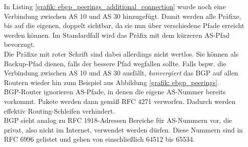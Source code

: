 In Listing \ref{grafik: ebgp_peerings_additional_connection} wurde noch eine Verbindung zwischen AS 10 und AS 30 hinzugefügt. Damit werden alle Präfixe, bis auf die eigenen, doppelt sichtbar, da sie nun über verschiedene Pfade erreicht werden können. Im Standardfall wird das Präfix mit dem kürzeren AS-Pfad bevorzugt.\\
Die Präfixe mit roter Schrift sind dabei allerdings nicht wertlos. Sie können als Backup-Pfad dienen, falls der bessere Pfad wegfallen sollte. Falls bspw. die Verbindung zwischen AS 10 und AS 30 ausfällt, \textit{konvergiert} das BGP auf allen Routern wieder hin zum Beispiel aus Abbildung \ref{grafik: ebgp_peerings}.\\
BGP-Router ignorieren AS-Pfade, in denen die eigene AS-Nummer bereits vorkommt. Pakete werden dann gemäß RFC 4271 verworfen. Dadurch werden effektiv Routing-Schleifen verhindert\cite{rfc4271}.\\
BGP sieht analog zu RFC 1918-Adressen Bereiche für AS-Nummern vor, die privat, also nicht im Internet, verwendet werden dürfen. Diese Nummern sind in RFC 6996 gelistet und gehen von einschließlich 64512 bis 65534\cite{rfc6996}.

